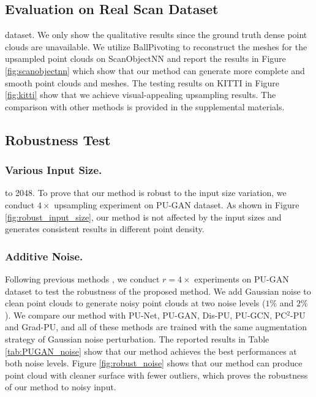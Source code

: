 \documentclass[letterpaper]{article} %
\begin{document}
\subsection{Evaluation on Real Scan Dataset}
 dataset. We only show the qualitative results since the ground truth dense point clouds are unavailable. We utilize BallPivoting \cite{bernardini1999ball} to reconstruct the meshes for the upsampled point clouds on ScanObjectNN and report the results in Figure \ref{fig:scanobjectnn} which show that our method can generate more complete and smooth point clouds and meshes. The testing results on KITTI in Figure \ref{fig:kitti} show that we achieve visual-appealing upsampling results. The comparison with other methods is provided in the supplemental materials.

\subsection{Robustness Test}
\subsubsection{Various Input Size.}
 to 2048. To prove that our method is robust to the input size variation, we conduct $4\times$ upsampling experiment on PU-GAN dataset. As shown in Figure \ref{fig:robust_input_size}, our method is not affected by the input sizes and generates consistent results in different point density.

\subsubsection{Additive Noise.} Following previous methods \cite{qian2021pu, long2022pc2, he2023grad}, we conduct $r=4\times$ experiments on PU-GAN dataset to test the robustness of the proposed method. We add Gaussian noise to clean point clouds to generate noisy point clouds at two noise levels ($1\%$ and $2\%$). We compare our method with PU-Net, PU-GAN, Dis-PU, PU-GCN, PC${^2}$-PU and Grad-PU, and all of these methods are trained with the same augmentation strategy of Gaussian noise perturbation. The reported results in Table \ref{tab:PUGAN_noise} show that our method achieves the best performances at both noise levels. Figure \ref{fig:robust_noise} shows that our method can produce point cloud with cleaner surface with fewer outliers, which proves the robustness of our method to noisy input.
\end{document}
